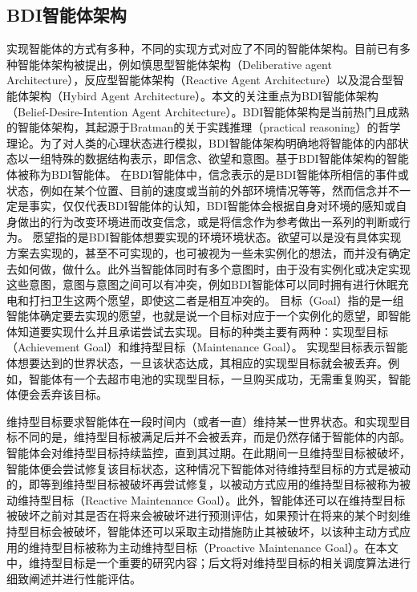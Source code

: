 \subsection{BDI智能体架构}
实现智能体的方式有多种，不同的实现方式对应了不同的智能体架构。目前已有多种智能体架构被提出，例如慎思型智能体架构（Deliberative agent Architecture），反应型智能体架构（Reactive Agent Architecture）以及混合型智能体架构（Hybird Agent Architecture）。本文的关注重点为BDI智能体架构（Belief-Desire-Intention Agent Architecture）。BDI智能体架构是当前热门且成熟的智能体架构，其起源于Bratman的关于实践推理（practical reasoning）的哲学理论\cite{bratman1987intention}。为了对人类的心理状态进行模拟，BDI智能体架构明确地将智能体的内部状态以一组特殊的数据结构表示，即信念、欲望和意图。基于BDI智能体架构的智能体被称为BDI智能体。
在BDI智能体中，信念表示的是BDI智能体所相信的事件或状态，例如在某个位置、目前的速度或当前的外部环境情况等等，然而信念并不一定是事实，仅仅代表BDI智能体的认知，BDI智能体会根据自身对环境的感知或自身做出的行为改变环境进而改变信念，或是将信念作为参考做出一系列的判断或行为。
愿望指的是BDI智能体想要实现的环境环境状态。欲望可以是没有具体实现方案去实现的，甚至不可实现的，也可被视为一些未实例化的想法，而并没有确定去如何做，做什么。此外当智能体同时有多个意图时，由于没有实例化或决定实现这些意图，意图与意图之间可以有冲突，例如BDI智能体可以同时拥有进行休眠充电和打扫卫生这两个愿望，即使这二者是相互冲突的。
目标（Goal）指的是一组智能体确定要去实现的愿望，也就是说一个目标对应于一个实例化的愿望，即智能体知道要实现什么并且承诺尝试去实现。目标的种类主要有两种：实现型目标（Achievement Goal）和维持型目标（Maintenance Goal）。
实现型目标表示智能体想要达到的世界状态，一旦该状态达成，其相应的实现型目标就会被丢弃。例如，智能体有一个去超市电池的实现型目标，一旦购买成功，无需重复购买，智能体便会丢弃该目标。

维持型目标要求智能体在一段时间内（或者一直）维持某一世界状态。和实现型目标不同的是，维持型目标被满足后并不会被丢弃，而是仍然存储于智能体的内部。智能体会对维持型目标持续监控，直到其过期。在此期间一旦维持型目标被破坏，智能体便会尝试修复该目标状态，这种情况下智能体对待维持型目标的方式是被动的，即等到维持型目标被破坏再尝试修复，以被动方式应用的维持型目标被称为被动维持型目标（Reactive Maintenance Goal）。此外，智能体还可以在维持型目标被破坏之前对其是否在将来会被破坏进行预测评估，如果预计在将来的某个时刻维持型目标会被破坏，智能体还可以采取主动措施防止其被破坏，以该种主动方式应用的维持型目标被称为主动维持型目标（Proactive Maintenance Goal）。在本文中，维持型目标是一个重要的研究内容；后文将对维持型目标的相关调度算法进行细致阐述并进行性能评估。

